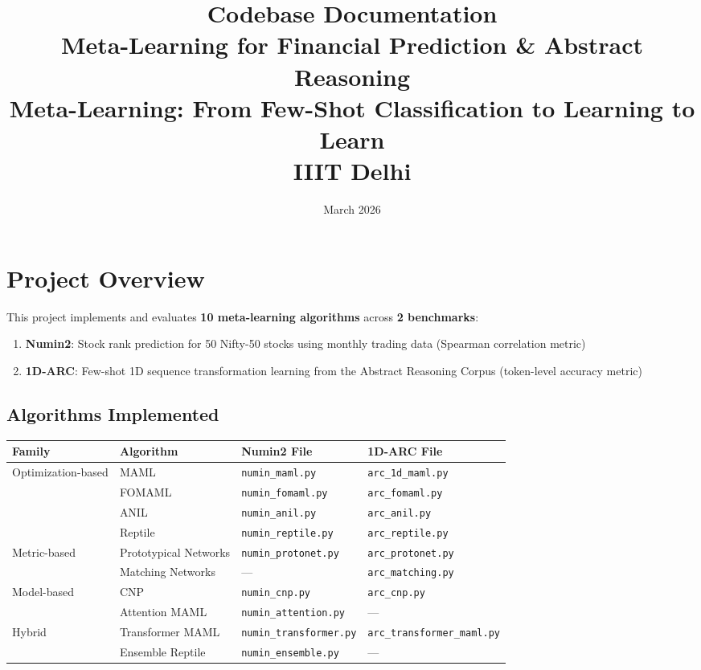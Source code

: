 \documentclass[11pt,a4paper]{article}
\title{\textbf{\LARGE Codebase Documentation}\\[6pt]
\Large Meta-Learning for Financial Prediction \& Abstract Reasoning\\[6pt]
\large Meta-Learning: From Few-Shot Classification to Learning to Learn\\IIIT Delhi}
\author{}\date{March 2026}
\begin{document}
\maketitle\thispagestyle{fancy}

\tableofcontents
\newpage

\section{Project Overview}

This project implements and evaluates \textbf{10 meta-learning algorithms} across \textbf{2 benchmarks}:

\begin{enumerate}[nosep]
  \item \textbf{Numin2}: Stock rank prediction for 50 Nifty-50 stocks using monthly trading data (Spearman correlation metric)
  \item \textbf{1D-ARC}: Few-shot 1D sequence transformation learning from the Abstract Reasoning Corpus (token-level accuracy metric)
\end{enumerate}

\subsection{Algorithms Implemented}
\begin{center}
\begin{tabular}{llll}
\toprule
\textbf{Family} & \textbf{Algorithm} & \textbf{Numin2 File} & \textbf{1D-ARC File} \\
\midrule
\multirow{4}{*}{Optimization-based} & MAML & \texttt{numin\_maml.py} & \texttt{arc\_1d\_maml.py} \\
 & FOMAML & \texttt{numin\_fomaml.py} & \texttt{arc\_fomaml.py} \\
 & ANIL & \texttt{numin\_anil.py} & \texttt{arc\_anil.py} \\
 & Reptile & \texttt{numin\_reptile.py} & \texttt{arc\_reptile.py} \\
\midrule
\multirow{2}{*}{Metric-based} & Prototypical Networks & \texttt{numin\_protonet.py} & \texttt{arc\_protonet.py} \\
 & Matching Networks & --- & \texttt{arc\_matching.py} \\
\midrule
\multirow{2}{*}{Model-based} & CNP & \texttt{numin\_cnp.py} & \texttt{arc\_cnp.py} \\
 & Attention MAML & \texttt{numin\_attention.py} & --- \\
\midrule
\multirow{2}{*}{Hybrid} & Transformer MAML & \texttt{numin\_transformer.py} & \texttt{arc\_transformer\_maml.py} \\
 & Ensemble Reptile & \texttt{numin\_ensemble.py} & --- \\
\bottomrule
\end{tabular}
\end{center}
\end{document}
